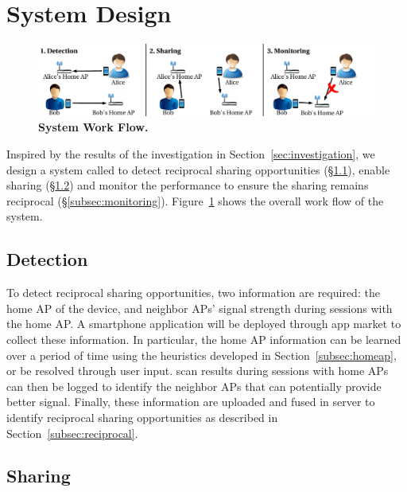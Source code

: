 \section{System Design}
\label{sec:design}

\begin{figure}[t]
  \centering
  \includegraphics[width=\textwidth]{./figures/design.pdf}
  \caption{\textbf{\wisefi{} System Work Flow.}}
  \label{fig:design}
\end{figure}

Inspired by the results of the investigation in Section~\ref{sec:investigation},
we design a system called \wisefi{} to detect reciprocal sharing
opportunities (\S\ref{subsec:detection}), enable \wifi{} sharing
(\S\ref{subsec:sharing}) and monitor the \wifi{} performance to ensure the
sharing remains reciprocal (\S\ref{subsec:monitoring}). Figure~\ref{fig:design}
shows the overall work flow of the \wisefi{} system.

\subsection{Detection}
\label{subsec:detection}

To detect reciprocal sharing opportunities, two information are required: the
home AP of the device, and neighbor APs' signal strength during \wifi{} sessions
with the home AP. A smartphone application will be deployed through app market
to collect these information. In particular, the home AP information can be
learned over a period of time using the heuristics developed in
Section~\ref{subsec:homeap}, or be resolved through user input. \wifi{} scan
results during sessions with home APs can then be logged to identify the
neighbor APs that can potentially provide better signal. Finally, these
information are uploaded and fused in \wisefi{} server to identify reciprocal
sharing opportunities as described in Section~\ref{subsec:reciprocal}.

\subsection{Sharing}
\label{subsec:sharing}

